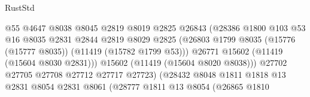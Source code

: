 \begin{lexlean}{RustStd}
\begin{coremodule}
                                            @55
                                            @4647
                                            @8038
                                            @8045
                                            @2819
                                            @8019
                                            @2825
                                            @26843
                                            (@28386
                                              @1800
                                              @103
                                              @53
                                              @16
                                              @8035
                                              @2831
                                              @2844
                                              @2819
                                              @8029
                                              @2825
                                              (@26803
                                                @1799
                                                @8035
                                                (@15776 (@15777 @8035))
                                                (@11419 (@15782 @1799 @53)))
                                              @26771
                                              @15602
                                              (@11419 (@15604 @8030 @2831)))
                                            @15602
                                            (@11419 (@15604 @8020 @8038)))
                                          @27702
                                          @27705
                                          @27708
                                          @27712
                                          @27717
                                          @27723)
                                        (@28432
                                          @8048
                                          @1811
                                          @1818
                                          @13
                                          @2831
                                          @8054
                                          @2831
                                          @8061
                                          (@28777
                                            @1811
                                            @13
                                            @8054
                                            (@26865
                                              @1810

\end{coremodule}
\end{lexlean}
